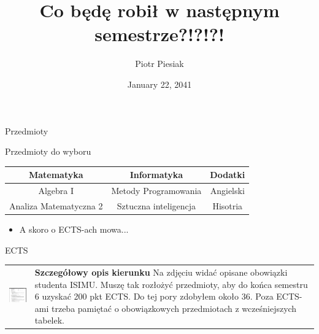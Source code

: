 \documentclass{beamer}
\title[Dalsze plany pewnego studenta]{Co będę robił w następnym semestrze?!?!?!}
\author{Piotr Piesiak}
\date{January 22, 2041}
\begin{document}
\begin{frame}
\titlepage
\end{frame}


\begin{frame}{Przedmioty}

\begin{block}{Przedmioty do wyboru}

\begin{tabular}{|c||c||c|}
\hline
\textbf{Matematyka}& \textbf{Informatyka}& \textbf{Dodatki}\\
\hline
 Algebra I & Metody Programowania & Angielski \\
\hline
 Analiza Matematyczna 2 & Sztuczna inteligencja & Hisotria \\
\hline
\end{tabular}

\end{block}

\begin{itemize}
	\pause 
\item A skoro o ECTS-ach mowa...
  \end{itemize}
\end{frame}

\begin{frame}{ECTS}
\begin{tabular}{ll}
		\includegraphics[width=3.5cm,angle=30]{zdj.png} &
		\parbox{0.5\linewidth}{
		\textbf{Szczegółowy opis kierunku} Na zdjęciu widać opisane obowiązki studenta ISIMU. Muszę tak rozłożyć przedmioty, aby do końca semestru 6 uzyskać 200 pkt ECTS. Do tej pory zdobyłem około 36. Poza ECTS-ami trzeba pamiętać o obowiązkowych przedmiotach z wcześniejszych tabelek.}

\end{tabular}

\end{frame}
\end{document}
